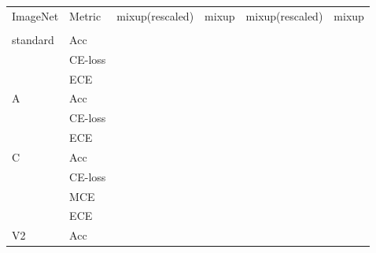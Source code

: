 \documentclass[twoside,11pt]{article}
\begin{document}
\begin{table}[H]
    \begin{center}
    \begin{small}
    \setlength\tabcolsep{4pt}
    \begin{tabular}{l l c c c c }
        \toprule    
        \multirow{2}{*}{ImageNet} & \multirow{2}{*}{Metric} &  mixup(rescaled) &  mixup &  mixup(rescaled) &  mixup  \\
         \cmidrule(lr){3-4} \cmidrule(lr){5-6} 
        {} & {} &  \multicolumn{2}{c}{}  &  \multicolumn{2}{c}{} \\
        \midrule
        \multirow{3}{*}{standard} & Acc                 &                       &                         &                        &                       \\
        & CE-loss                      &                       &                         &                        &                       \\
        & ECE                      &                       &                         &                        &                       \\
        \midrule
        \multirow{3}{*}{A} & Acc               &                       &                         &                        &                       \\
        & CE-loss                    &                       &                         &                        &                       \\
        & ECE                    &                       &                         &                        &                       \\
        \midrule
        \multirow{4}{*}{C} & Acc          &                       &                         &                        &                       \\
        & CE-loss               &                       &                         &                        &                       \\
        & MCE                   &                       &                         &                        &                       \\
        & ECE               &                       &                         &                        &                       \\
        \midrule
        \multirow{3}{*}{V2} & Acc              &                       &                         &                        &                       \\

\end{tabular}
\end{small}
\end{center}
\end{table}
\end{document}

